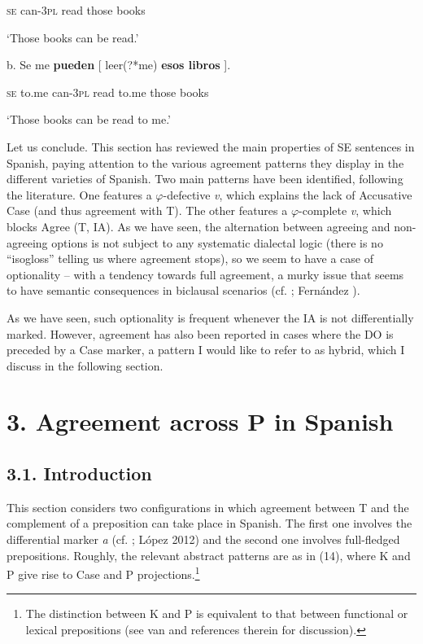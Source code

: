 \documentclass[output=paper]{langsci/langscibook}
\begin{document}
                  \textsc{se} can\textsc{{}-3pl}   read  those  books

        ‘Those books can be read.’

  b.   Se   me      \textbf{pueden}  [ leer(?*me)    \textbf{esos    libros} ].

         \textsc{se} to.me  can\textsc{{}-3pl}    read   to.me  those  books

         ‘Those books can be read to me.’

Let us conclude. This section has reviewed the main properties of SE sentences in Spanish, paying attention to the various agreement patterns they display in the different varieties of Spanish. Two main patterns have been identified, following the literature. One features a $\varphi $-defective \textit{v}, which explains the lack of Accusative Case (and thus agreement with T). The other features a $\varphi $-complete \textit{v}, which blocks Agree (T, IA). As we have seen, the alternation between agreeing and non-agreeing options is not subject to any systematic dialectal logic (there is no “isogloss” telling us where agreement stops), so we seem to have a case of optionality – with a tendency towards full agreement, a murky issue that seems to have semantic consequences in biclausal scenarios (cf. \citet{Martin1998}; Fernández \citealt{Serrano2016}). 

  As we have seen, such optionality is frequent whenever the IA is not differentially marked. However, agreement has also been reported in cases where the DO is preceded by a Case marker, a pattern I would like to refer to as hybrid, which I discuss in the following section.

\section{ 3. Agreement across P in Spanish} 

\subsection{ 3.1. Introduction}

This section considers two configurations in which agreement between T and the complement of a preposition can take place in Spanish. The first one involves the differential marker \textit{a} (cf. \citealt{Torrego1998}; López 2012) and the second one involves full-fledged prepositions. Roughly, the relevant abstract patterns are as in (14), where K and P give rise to Case and P projections.\footnote{The distinction between K and P is equivalent to that between functional or lexical prepositions (see van \citealt{Riemsdijk1990} and references therein for discussion).}
\end{document}
